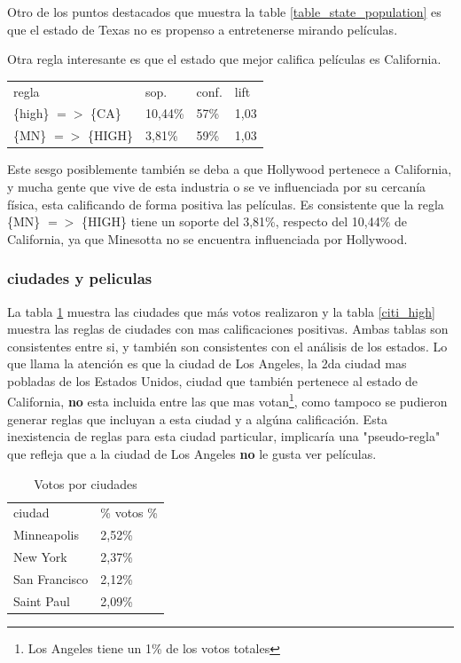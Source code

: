 \documentclass[journal]{IEEEtran}
\begin{document}
Otro de los puntos destacados que muestra la table \ref{table_state_population} es
que el estado de Texas no es propenso a entretenerse mirando películas.

Otra regla interesante es que el estado que mejor califica películas es California.

\begin{table}[ht!]
\centering
\begin{tabular}{l l l l }
regla & sop. & conf. & lift \\
\{high\} $=$$>$ \{CA\} & 10,44\% & 57\% & 1,03 \\
\{MN\} $=$$>$ \{HIGH\} & 3,81\% & 59\% & 1,03 
\end{tabular}
\end{table}

Este sesgo posiblemente también se deba a que Hollywood pertenece a California,
y mucha gente que vive de esta industria o se ve influenciada por su cercanía
física, 
esta calificando de forma positiva las películas. Es consistente que la regla
\{MN\} $=$$>$ \{HIGH\} tiene un soporte del 3,81\%, respecto del 10,44\% de 
California, ya que Minesotta no se encuentra influenciada por Hollywood.

\subsubsection{ciudades y peliculas}
La tabla \ref{citi_votes} muestra las ciudades que más votos realizaron y
la tabla \ref{citi_high} muestra las reglas de ciudades con mas calificaciones
positivas. Ambas tablas son consistentes entre si, y también son consistentes
con el análisis de los estados. Lo que llama la atención es que la ciudad de Los
Angeles, la 2da ciudad mas  pobladas de los Estados Unidos, 
ciudad que también pertenece al estado de California, 
\textbf{no} esta incluida entre las que mas votan\footnote{Los Angeles tiene
un 1\% de los votos totales}, como tampoco se pudieron generar reglas que 
incluyan a esta ciudad y a algúna calificación. Esta inexistencia
de reglas para esta ciudad particular, implicaría una "pseudo-regla" que
refleja que a la ciudad de Los Angeles \textbf{no} le gusta ver películas.
 
\begin{table}[ht!]
\caption{Votos por ciudades}
\label{citi_votes}
\centering
\begin{tabular}{l l }
ciudad & \% votos \% \\
Minneapolis & 2,52\% \\
New York & 2,37\% \\
San Francisco & 2,12\% \\
Saint Paul & 2,09\%  \\
\end{tabular}
\end{table}
\end{document}
